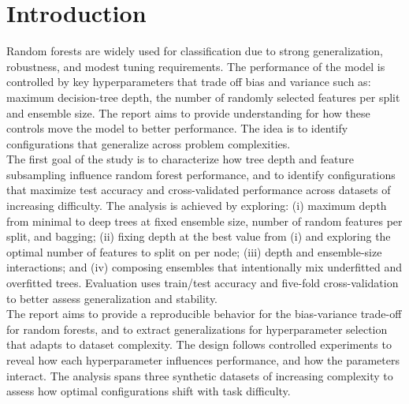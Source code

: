 \documentclass[conference]{IEEEtran}
\begin{document}
\section{Introduction}

Random forests are widely used for classification due to strong generalization, robustness, and modest tuning requirements. The performance of the model is controlled by key hyperparameters that trade off bias and variance such as: maximum decision-tree depth, the number of randomly selected features per split and ensemble size. The report aims to provide understanding for how these controls move the model to better performance. The idea is to identify configurations that generalize across problem complexities.\\

The first goal of the study is to characterize how tree depth and feature subsampling influence random forest performance, and to identify configurations that maximize test accuracy and cross-validated performance across datasets of increasing difficulty. The analysis is achieved by exploring: (i) maximum depth from minimal to deep trees at fixed ensemble size, number of random features per split, and bagging; (ii) fixing depth at the best value from (i) and exploring the optimal number of features to split on per node; (iii) depth and ensemble-size interactions; and (iv) composing ensembles that intentionally mix underfitted and overfitted trees. Evaluation uses train/test accuracy and five-fold cross-validation to better assess generalization and stability.\\

The report aims to provide a reproducible behavior for the bias-variance trade-off for random forests, and to extract generalizations for hyperparameter selection that adapts to dataset complexity. The design follows controlled experiments to reveal how each hyperparameter influences performance, and how the parameters interact. The analysis spans three synthetic datasets of increasing complexity to assess how optimal configurations shift with task difficulty.\\
\end{document}
